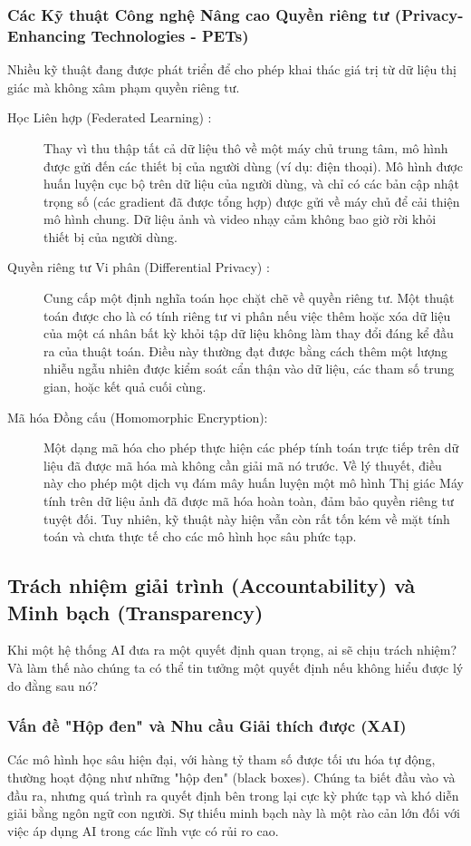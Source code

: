 \subsubsection{Các Kỹ thuật Công nghệ Nâng cao Quyền riêng tư (Privacy-Enhancing Technologies - PETs)}
\label{subsubsec:privacy_enhancing_tech}
Nhiều kỹ thuật đang được phát triển để cho phép khai thác giá trị từ dữ liệu thị giác mà không xâm phạm quyền riêng tư.
\begin{description}
    \item[Học Liên hợp (Federated Learning) \cite{McMahan2017}:] Thay vì thu thập tất cả dữ liệu thô về một máy chủ trung tâm, mô hình được gửi đến các thiết bị của người dùng (ví dụ: điện thoại). Mô hình được huấn luyện cục bộ trên dữ liệu của người dùng, và chỉ có các bản cập nhật trọng số (các gradient đã được tổng hợp) được gửi về máy chủ để cải thiện mô hình chung. Dữ liệu ảnh và video nhạy cảm không bao giờ rời khỏi thiết bị của người dùng.
    \item[Quyền riêng tư Vi phân (Differential Privacy) \cite{Dwork2006}:] Cung cấp một định nghĩa toán học chặt chẽ về quyền riêng tư. Một thuật toán được cho là có tính riêng tư vi phân nếu việc thêm hoặc xóa dữ liệu của một cá nhân bất kỳ khỏi tập dữ liệu không làm thay đổi đáng kể đầu ra của thuật toán. Điều này thường đạt được bằng cách thêm một lượng nhiễu ngẫu nhiên được kiểm soát cẩn thận vào dữ liệu, các tham số trung gian, hoặc kết quả cuối cùng.
    \item[Mã hóa Đồng cấu (Homomorphic Encryption):] Một dạng mã hóa cho phép thực hiện các phép tính toán trực tiếp trên dữ liệu đã được mã hóa mà không cần giải mã nó trước. Về lý thuyết, điều này cho phép một dịch vụ đám mây huấn luyện một mô hình Thị giác Máy tính trên dữ liệu ảnh đã được mã hóa hoàn toàn, đảm bảo quyền riêng tư tuyệt đối. Tuy nhiên, kỹ thuật này hiện vẫn còn rất tốn kém về mặt tính toán và chưa thực tế cho các mô hình học sâu phức tạp.
\end{description}

\subsection{Trách nhiệm giải trình (Accountability) và Minh bạch (Transparency)}
\label{subsec:accountability_transparency}
Khi một hệ thống AI đưa ra một quyết định quan trọng, ai sẽ chịu trách nhiệm? Và làm thế nào chúng ta có thể tin tưởng một quyết định nếu không hiểu được lý do đằng sau nó?

\subsubsection{Vấn đề "Hộp đen" và Nhu cầu Giải thích được (XAI)}
\label{subsubsec:black_box_xai}
Các mô hình học sâu hiện đại, với hàng tỷ tham số được tối ưu hóa tự động, thường hoạt động như những "hộp đen" (black boxes). Chúng ta biết đầu vào và đầu ra, nhưng quá trình ra quyết định bên trong lại cực kỳ phức tạp và khó diễn giải bằng ngôn ngữ con người. Sự thiếu minh bạch này là một rào cản lớn đối với việc áp dụng AI trong các lĩnh vực có rủi ro cao.

